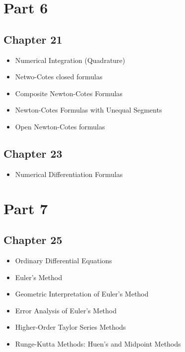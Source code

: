 \documentclass [titlepage,12pt,letter] {article}
\begin{document}
\section{Part 6}

\subsection{Chapter 21}

\begin{itemize}

\item{Numerical Integration (Quadrature)} 

\item{Netwo-Cotes closed formulas} 

\item{Composite Newton-Cotes Formulas} 

\item{Newton-Cotes Formulas with Unequal Segments} 

\item{Open Newton-Cotes formulas} 

\end{itemize}

\subsection{Chapter 23}

\begin{itemize}

\item{Numerical Differentiation Formulas} 

\end{itemize}

\section{Part 7}

\subsection{Chapter 25}

\begin{itemize}

\item{Ordinary Differential Equations}

\item{Euler's Method}

\item{Geometric Interpretation of Euler's Method}

\item{Error Analysis of Euler's Method}

\item{Higher-Order Taylor Series Methods}

\item{Runge-Kutta Methods: Huen's and Midpoint Methods}

\end{itemize}
\end{document}

